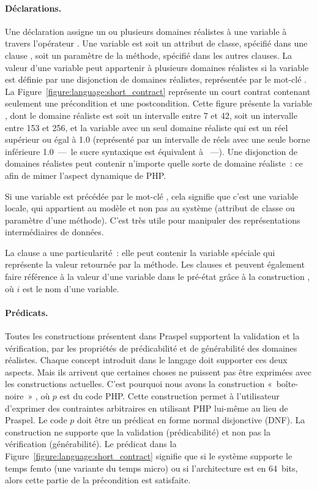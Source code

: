 \paragraph{Déclarations.} Une déclaration assigne un ou plusieurs domaines
réalistes à une variable à travers l'opérateur \code{:}. Une variable est soit
un attribut de classe, spécifié dans une clause \ainvariant, soit un paramètre
de la méthode, spécifié dans les autres clauses. La valeur d'une variable peut
appartenir à plusieurs domaines réalistes si la variable est définie par une
{\strong disjonction} de domaines réalistes, représentée par le mot-clé
.  La Figure~\ref{figure:language:short_contract} représente un court
contrat contenant seulement une précondition et une postcondition. Cette figure
présente la variable , dont le domaine réaliste est soit un
intervalle entre 7 et 42, soit un intervalle entre 153 et 256, et la variable
 avec un seul domaine réaliste qui est un réel supérieur ou égal à
1.0 (représenté par un intervalle de réels avec une seule borne inférieure
1.0~—~le sucre syntaxique  est équivalent à ~—). Une disjonction de domaines réalistes peut contenir n'importe quelle
sorte de domaine réaliste~: ce afin de mimer l'aspect dynamique de PHP.

Si une variable est précédée par le mot-clé , cela signifie que c'est
une variable {\strong locale}, qui appartient au modèle et non pas au système
(attribut de classe ou paramètre d'une méthode). C'est très utile pour
manipuler des représentations intermédiaires de données.

La clause \aensures a une particularité~: elle peut contenir la variable
spéciale \aresult qui représente la valeur {\strong retournée} par la méthode.
Les clauses \aensures et \athrowable peuvent également faire {\strong référence}
à la valeur d'une variable dans le pré-état grâce à la construction , où
$i$ est le nom d'une variable.

\paragraph{Prédicats.} Toutes les constructions présentent dans Praspel
supportent la validation et la vérification, \ie par les propriétés de
prédicabilité et de générabilité des domaines réalistes. Chaque concept
introduit dans le langage doit supporter ces deux aspects. Mais ils arrivent que
certaines choses ne puissent pas être exprimées avec les constructions
actuelles. C'est pourquoi nous avons la construction «~boîte-noire~» ,
où $p$ est du code PHP. Cette construction permet à l'utilisateur d'exprimer des
contraintes arbitraires en utilisant PHP lui-même au lieu de Praspel. Le code
$p$ doit être un prédicat en forme normal {\strong disjonctive} (DNF). La
construction  ne supporte que la validation (prédicabilité) et non pas
la vérification (générabilité). Le prédicat  dans la Figure~\ref{figure:language:short_contract} signifie que
si le système supporte le temps femto (une variante du temps micro) ou si
l'architecture est en 64~bits, alors cette partie de la précondition est
satisfaite.

